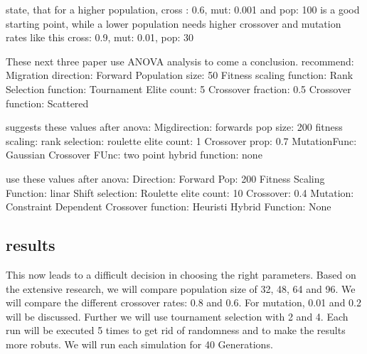 \cite{srinivas_genetic_1994} state, that for a higher population, cross : 0.6, mut: 0.001 and pop: 100 is a good starting point, while a lower population needs higher crossover and mutation rates like this cross: 0.9, mut: 0.01, pop: 30

These next three paper use ANOVA analysis to come a conclusion. \cite{fazal_estimating_2005} recommend:
Migration direction: Forward
Population size: 50 
Fitness scaling function: Rank
Selection function: Tournament
Elite count: 5
Crossover fraction: 0.5
Crossover function: Scattered


\cite{dao_maximising_2016} suggests these values after anova:
Migdirection: forwards
pop size: 200
fitness scaling: rank
selection: roulette
elite count: 1
Crossover prop: 0.7
MutationFunc: Gaussian
Crossover FUnc: two point
hybrid function: none


\cite{assistant_professor_amity_university_jaipur_rajasthan_india_parameter_2019} use these values after anova:
Direction: Forward
Pop: 200 
Fitness Scaling Function: linar Shift
selection: Roulette 
elite count: 10 
Crossover: 0.4 
Mutation: Constraint Dependent 
Crossover function: Heuristi
Hybrid Function: None




\subsection{results}
This now leads to a difficult decision in choosing the right parameters. Based on the extensive research, we will compare population size of 32, 48, 64 and 96. We will compare the different crossover rates: 0.8 and 0.6. For mutation, 0.01 and 0.2 will be discussed. Further we will use tournament selection with 2 and 4.
Each run will be executed 5 times to get rid of randomness and to make the results more robuts. We will run each simulation for 40 Generations.

